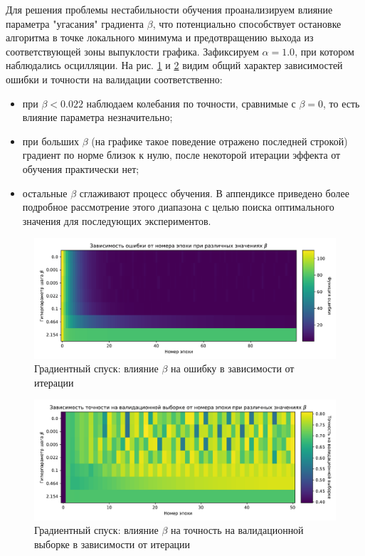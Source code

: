 \documentclass{article}
\begin{document}
                Для решения проблемы нестабильности обучения проанализируем влияние параметра "угасания" градиента $\beta$, что потенциально способствует остановке алгоритма в точке локального минимума и предотвращению выхода из соответствующей зоны выпуклости графика. Зафиксируем $\alpha = 1.0$, при котором наблюдались осцилляции. На рис. \ref{fig:3} и \ref{fig:4} видим общий характер зависимостей ошибки и точности на валидации соответственно:
                \begin{itemize}
                    \item при $\beta < 0.022$ наблюдаем колебания по точности, сравнимые с $\beta = 0$, то есть влияние параметра незначительно;
                    \item при больших $\beta$ (на графике такое поведение отражено последней строкой) градиент по норме близок к нулю, после некоторой итерации эффекта от обучения практически нет;
                    \item остальные $\beta$ сглаживают процесс обучения. В аппендиксе приведено более подробное рассмотрение этого диапазона с целью поиска оптимального значения для последующих экспериментов. 
                \end{itemize}
                \begin{figure}[H]
                    \centering
                    \includegraphics[width=0.8\linewidth]{./pictures/GDbetas_func.pdf}
                    \caption{Градиентный спуск: влияние $\beta$ на ошибку в зависимости от итерации}
                    \label{fig:3}
                \end{figure}
                \begin{figure}[H]
                    \centering
                    \includegraphics[width=0.8\linewidth]{./pictures/GDbetas_val_accuracy.pdf}
                    \caption{Градиентный спуск: влияние $\beta$ на точность на валидационной выборке в зависимости от итерации}
                    \label{fig:4}
                \end{figure}
\end{document}

